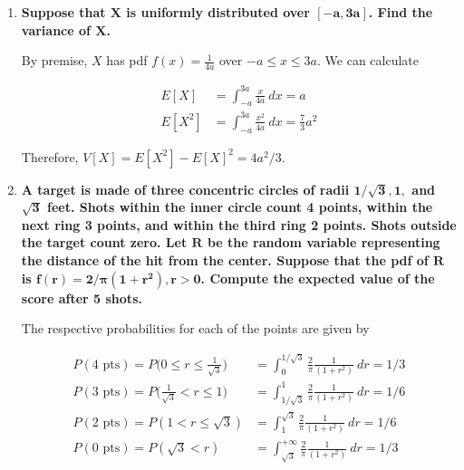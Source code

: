 \documentclass[10pt, oneside]{article}
\begin{document}
\begin{enumerate}[label=7.\arabic*]
\item  \begin{tcolorbox}[
  colback=Cerulean!5!white,
  colframe=Cerulean!75!black]
  \textbf{Suppose that $\bm{X}$ is uniformly distributed over $\bm{[-a, 3a]}$. Find the variance of $\bm{X}$.}
  \end{tcolorbox}
  
  By premise, $X$ has pdf $f(x) = \frac{1}{4a}$ over $-a \leq x \leq 3a$. We can calculate
  
  \begin{align*}
  E[X] &= \int^{3a}_{-a} \frac{x}{4a} \ dx = a \\
  E[X^2] &= \int^{3a}_{-a} \frac{x^2}{4a}\ dx = \frac{7}{3} a^2
  \end{align*}
  
  Therefore, $V[X] = E[X^2] - E[X]^2 = \boxed{4a^2 / 3}$.
  
\item  \begin{tcolorbox}[
  colback=Cerulean!5!white,
  colframe=Cerulean!75!black]
  \textbf{A target is made of three concentric circles of radii $\bm{1/ \sqrt{3}}, \bm{1},$ and $\bm{\sqrt{3}}$ feet. Shots within the inner circle count 4 points, within the next ring 3 points, and within the third ring 2 points. Shots outside the target count zero. Let $\bm{R}$ be the random variable representing the distance of the hit from the center. Suppose that the pdf of $\bm{R}$ is $\bm{f(r) = 2 / \pi (1+r^2), r > 0}$. Compute the expected value of the score after 5 shots.}
  \end{tcolorbox}
  
  The respective probabilities for each of the points are given by
  
  \begin{align*}
  P(\text{4 pts}) = P\Bigg( 0 \leq r \leq \frac{1}{\sqrt{3}} \Bigg) &= \int^{1/\sqrt{3}}_0 \frac{2}{\pi} \frac{1}{(1+r^2)} \ dr = \boxed{1/3} \\
  P(\text{3 pts}) = P\Bigg( \frac{1}{\sqrt{3}} < r \leq 1 \Bigg) &= \int^{1}_{1/\sqrt{3}} \frac{2}{\pi} \frac{1}{(1+r^2)} \ dr = \boxed{1/6} \\
  P(\text{2 pts}) = P( 1 < r \leq \sqrt{3} ) &= \int^{\sqrt{3}}_{1} \frac{2}{\pi} \frac{1}{(1+r^2)} \ dr = \boxed{1/6} \\
  P(\text{0 pts}) = P( \sqrt{3} < r ) &= \int^{+\infty}_{\sqrt{3}} \frac{2}{\pi} \frac{1}{(1+r^2)} \ dr = \boxed{1/3} 
  \end{align*}
  

\end{enumerate}
\end{document}
